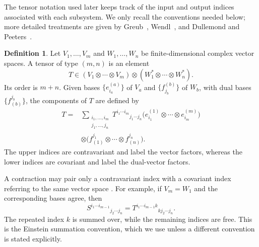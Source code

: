 \documentclass[
    aps,
    pra,
    reprint,
    superscriptaddress,
    nofootinbib
]{revtex4-2}
\theoremstyle{definition}
\newtheorem{definition}{Definition}[section]
\theoremstyle{plain}
\begin{document}
The tensor notation used later keeps track of the input and output indices
associated with each subsystem. We only recall the conventions needed
below; more detailed treatments are given by
Greub~\cite[Secs.~3.12--3.13]{Greub1978},
Wendl~\cite[Secs.~A.6--A.7, pp.~175--180]{Wendl2008Multilinear}, and
Dullemond and
Peeters~\cite[pp.~13 and 21--22]{DullemondPeeters2010}.

\begin{definition}
    Let $V_{1},\ldots,V_{m}$ and $W_{1},\ldots,W_{n}$ be
    finite-dimensional complex vector spaces. A tensor of type
    $(m,n)$ is an element
    \begin{equation}
        T\in
        (V_{1}\otimes\cdots\otimes V_{m})
        \otimes
        (W_{1}^{*}\otimes\cdots\otimes W_{n}^{*}).
    \end{equation}
    Its order is $m+n$. Given bases $\{e^{(a)}_{i_{a}}\}$ of $V_{a}$ and
    $\{f^{(b)}_{j_{b}}\}$ of $W_{b}$, with dual bases
    $\{f_{(b)}^{j_{b}}\}$, the components of $T$ are defined by
    \begin{equation}
        \begin{aligned}
        T={}&
        \sum_{\substack{i_{1},\ldots,i_{m}\\
                        j_{1},\ldots,j_{n}}}
        T^{i_{1}\cdots i_{m}}{}_{j_{1}\cdots j_{n}}
        \bigl(
            e^{(1)}_{i_{1}}\otimes\cdots\otimes e^{(m)}_{i_{m}}
        \bigr)\\
        &\otimes
        \bigl(
            f_{(1)}^{j_{1}}\otimes\cdots\otimes f_{(n)}^{j_{n}}
        \bigr).
        \end{aligned}
    \end{equation}
    The upper indices are contravariant and label the vector factors,
    whereas the lower indices are covariant and label the dual-vector
    factors.
\end{definition}

A contraction may pair only a contravariant index with a covariant index
referring to the same vector space
\cite[p.~22]{DullemondPeeters2010}. For example, if $V_{m}=W_{1}$ and the
corresponding bases agree, then
\begin{equation}
    S^{i_{1}\cdots i_{m-1}}{}_{j_{2}\cdots j_{n}}
    =
    T^{i_{1}\cdots i_{m-1}k}{}_{k j_{2}\cdots j_{n}}.
\end{equation}
The repeated index $k$ is summed over, while the remaining indices are
free. This is the Einstein summation convention, which we use unless a
different convention is stated explicitly.
\end{document}
